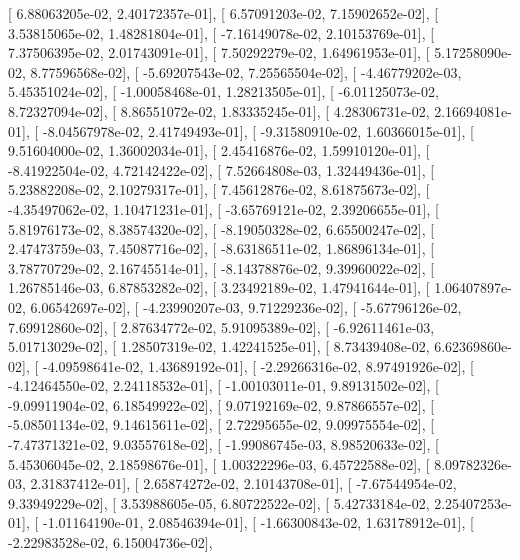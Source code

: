 \documentclass{article}
\begin{document}
       [  6.88063205e-02,   2.40172357e-01],
       [  6.57091203e-02,   7.15902652e-02],
       [  3.53815065e-02,   1.48281804e-01],
       [ -7.16149078e-02,   2.10153769e-01],
       [  7.37506395e-02,   2.01743091e-01],
       [  7.50292279e-02,   1.64961953e-01],
       [  5.17258090e-02,   8.77596568e-02],
       [ -5.69207543e-02,   7.25565504e-02],
       [ -4.46779202e-03,   5.45351024e-02],
       [ -1.00058468e-01,   1.28213505e-01],
       [ -6.01125073e-02,   8.72327094e-02],
       [  8.86551072e-02,   1.83335245e-01],
       [  4.28306731e-02,   2.16694081e-01],
       [ -8.04567978e-02,   2.41749493e-01],
       [ -9.31580910e-02,   1.60366015e-01],
       [  9.51604000e-02,   1.36002034e-01],
       [  2.45416876e-02,   1.59910120e-01],
       [ -8.41922504e-02,   4.72142422e-02],
       [  7.52664808e-03,   1.32449436e-01],
       [  5.23882208e-02,   2.10279317e-01],
       [  7.45612876e-02,   8.61875673e-02],
       [ -4.35497062e-02,   1.10471231e-01],
       [ -3.65769121e-02,   2.39206655e-01],
       [  5.81976173e-02,   8.38574320e-02],
       [ -8.19050328e-02,   6.65500247e-02],
       [  2.47473759e-03,   7.45087716e-02],
       [ -8.63186511e-02,   1.86896134e-01],
       [  3.78770729e-02,   2.16745514e-01],
       [ -8.14378876e-02,   9.39960022e-02],
       [  1.26785146e-03,   6.87853282e-02],
       [  3.23492189e-02,   1.47941644e-01],
       [  1.06407897e-02,   6.06542697e-02],
       [ -4.23990207e-03,   9.71229236e-02],
       [ -5.67796126e-02,   7.69912860e-02],
       [  2.87634772e-02,   5.91095389e-02],
       [ -6.92611461e-03,   5.01713029e-02],
       [  1.28507319e-02,   1.42241525e-01],
       [  8.73439408e-02,   6.62369860e-02],
       [ -4.09598641e-02,   1.43689192e-01],
       [ -2.29266316e-02,   8.97491926e-02],
       [ -4.12464550e-02,   2.24118532e-01],
       [ -1.00103011e-01,   9.89131502e-02],
       [ -9.09911904e-02,   6.18549922e-02],
       [  9.07192169e-02,   9.87866557e-02],
       [ -5.08501134e-02,   9.14615611e-02],
       [  2.72295655e-02,   9.09975554e-02],
       [ -7.47371321e-02,   9.03557618e-02],
       [ -1.99086745e-03,   8.98520633e-02],
       [  5.45306045e-02,   2.18598676e-01],
       [  1.00322296e-03,   6.45722588e-02],
       [  8.09782326e-03,   2.31837412e-01],
       [  2.65874272e-02,   2.10143708e-01],
       [ -7.67544954e-02,   9.33949229e-02],
       [  3.53988605e-05,   6.80722522e-02],
       [  5.42733184e-02,   2.25407253e-01],
       [ -1.01164190e-01,   2.08546394e-01],
       [ -1.66300843e-02,   1.63178912e-01],
       [ -2.22983528e-02,   6.15004736e-02],
\end{document}

